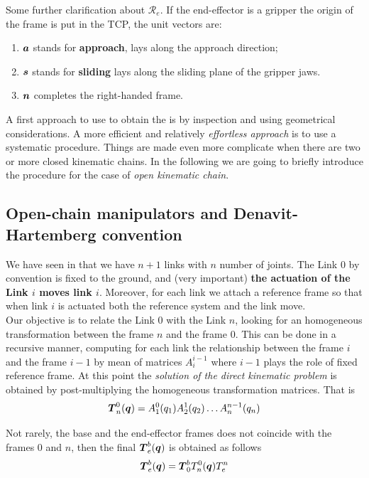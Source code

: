 Some further clarification about $\mathcal{R}_e$. If the end-effector is a gripper the origin of the frame is put in the TCP, the unit vectors are: 
\begin{enumerate}
    \itemsep-0.3em
    \item $\boldsymbol{a}$ stands for \textbf{approach}, lays along the approach direction; 
    \item $\boldsymbol{s}$ stands for \textbf{sliding} lays along the sliding plane of the gripper jaws.
    \item $\boldsymbol{n}$ completes the right-handed frame.
\end{enumerate}
A first approach to use to obtain the  is by inspection  and using geometrical considerations. A more efficient and relatively \textit{effortless approach} is to use a systematic procedure. Things are made even more complicate when there are two or more closed kinematic chains. In the following we are going to briefly introduce the procedure for the case of \textit{open kinematic chain}. 

\subsection{Open-chain manipulators and Denavit-Hartemberg convention}
We have seen in  that we have $n+1$ links with $n$ number of joints. The Link 0 by convention is fixed to the ground, and (very important) \textbf{the actuation of the Link $i$ moves link $i$}. Moreover, for each link we attach a reference frame so that when link $i$ is actuated both the reference system and the link move.\\
Our objective is to relate the Link 0 with the Link $n$, looking for an homogeneous transformation between the frame $n$ and the frame $0$. This can be done in a recursive manner, computing for each link the relationship between the frame $i$ and the frame $i-1$ by mean of matrices $A_{i}^{i-1}$ where $i-1$ plays the role of fixed reference frame. At this point the \textit{solution of the direct kinematic problem} is obtained by post-multiplying the homogeneous transformation matrices. That is
\begin{equation}
    \boldsymbol{T}_n^0(\boldsymbol{q}) = 
        A_1^0(q_1)A_2^1(q_2)\dots{A_n^{n-1}(q_n)}
\end{equation}

Not rarely, the base and the end-effector frames does not coincide with the frames 0 and $n$, then the final $\boldsymbol{T}_e^b(\boldsymbol{q})$ is obtained as follows
\begin{equation}
    \boldsymbol{T}_e^b(\boldsymbol{q})=\boldsymbol{T}_0^bT_n^0(\boldsymbol{q})T_e^n 
\end{equation}

